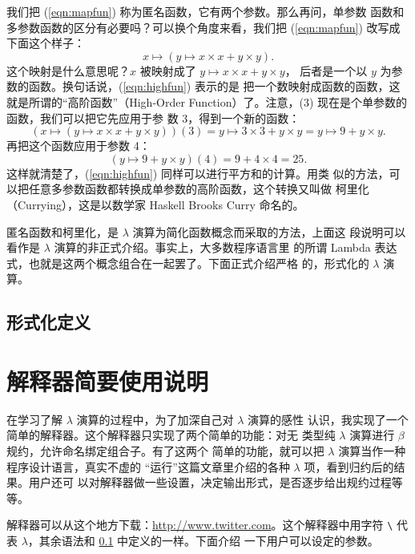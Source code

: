 \documentclass[a4paper,adobefonts]{ctexart}
\newcommand{\downloadurl}{\url{http://www.twitter.com}}
\begin{document}
我们把 (\ref{eqn:mapfun}) 称为匿名函数，它有两个参数。那么再问，单参数
函数和多参数函数的区分有必要吗？可以换个角度来看，我们把
(\ref{eqn:mapfun}) 改写成下面这个样子：
\begin{equation}\label{eqn:highfun}
x\mapsto(y\mapsto x\times x + y \times y).  
\end{equation}
这个映射是什么意思呢？$x$ 被映射成了 $y\mapsto x\times x + y \times y$，
后者是一个以 $y$ 为参数的函数。换句话说，(\ref{eqn:highfun}) 表示的是
把一个数映射成函数的函数，这就是所谓的``高阶函数''（High-Order
  Function）了。注意，(3) 现在是个单参数的函数，我们可以把它先应用于参
数 3，得到一个新的函数：
$$
(x\mapsto(y\mapsto x\times x + y \times y))(3)
=y\mapsto 3\times 3 + y \times y = y\mapsto 9 + y \times y.
$$
再把这个函数应用于参数 4：
$$
(y\mapsto 9 + y \times y)(4)=9+4\times 4=25.
$$这样就清楚了，(\ref{eqn:highfun}) 同样可以进行平方和的计算。用类
似的方法，可以把任意多参数函数都转换成单参数的高阶函数，这个转换又叫做
柯里化（Currying），这是以数学家 Haskell Brooks Curry 命名的。

匿名函数和柯里化，是 $\lambda$ 演算为简化函数概念而采取的方法，上面这
段说明可以看作是 $\lambda$ 演算的非正式介绍。事实上，大多数程序语言里
的所谓 Lambda 表达式，也就是这两个概念组合在一起罢了。下面正式介绍严格
的，形式化的 $\lambda$ 演算。

\subsection{形式化定义}\label{subsec:formal}
\newpage
\appendix
\section{解释器简要使用说明}

在学习了解 $\lambda$ 演算的过程中，为了加深自己对 $\lambda$ 演算的感性
认识，我实现了一个简单的解释器。这个解释器只实现了两个简单的功能：对无
类型纯 $\lambda$ 演算进行 $\beta$ 规约，允许命名绑定组合子。有了这两个
简单的功能，就可以把 $\lambda$ 演算当作一种程序设计语言，真实不虚的
``运行''这篇文章里介绍的各种 $\lambda$ 项，看到归约后的结果。用户还可
以对解释器做一些设置，决定输出形式，是否逐步给出规约过程等等。

解释器可以从这个地方下载：\downloadurl。这个解释器中用字符 \verb|\|
代表 $\lambda$，其余语法和 \ref{subsec:formal} 中定义的一样。下面介绍
一下用户可以设定的参数。
\end{document}
